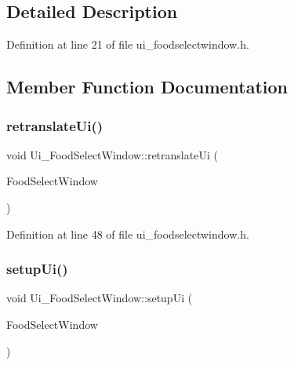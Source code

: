 \subsection{Detailed Description}


Definition at line 21 of file ui\+\_\+foodselectwindow.\+h.



\subsection{Member Function Documentation}
\mbox{\label{class_ui___food_select_window_aa0b4201d4db08190cb97fa76fbf3f39c}} 
\subsubsection{\texorpdfstring{retranslateUi()}{retranslateUi()}}
{\footnotesize\ttfamily void Ui\+\_\+\+Food\+Select\+Window\+::retranslate\+Ui (\begin{DoxyParamCaption}\item[{Q\+Widget $\ast$}]{Food\+Select\+Window }\end{DoxyParamCaption})\hspace{0.3cm}{\ttfamily [inline]}}



Definition at line 48 of file ui\+\_\+foodselectwindow.\+h.

\mbox{\label{class_ui___food_select_window_ae81797d9f7f0d379818c83b9867e0333}} 
\subsubsection{\texorpdfstring{setupUi()}{setupUi()}}
{\footnotesize\ttfamily void Ui\+\_\+\+Food\+Select\+Window\+::setup\+Ui (\begin{DoxyParamCaption}\item[{Q\+Widget $\ast$}]{Food\+Select\+Window }\end{DoxyParamCaption})\hspace{0.3cm}{\ttfamily [inline]}}



